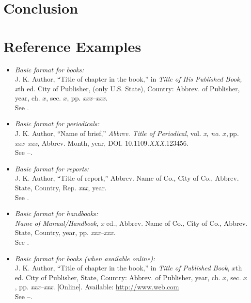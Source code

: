 \documentclass{IEEEtran}
\begin{document}
\section{Conclusion}

\vfill
\pagebreak

\section{Reference Examples}

\begin{itemize}

\item \emph{Basic format for books:}\\
J. K. Author, ``Title of chapter in the book,'' in \emph{Title of His Published Book, x}th ed. City of Publisher, (only U.S. State), Country: Abbrev. of Publisher, year, ch. $x$, sec. $x$, pp. \emph{xxx--xxx.}\\
See \cite{b1,b2}.

\item \emph{Basic format for periodicals:}\\
J. K. Author, ``Name of brief,'' \emph{Abbrev. Title of Periodical}, vol. \emph{x, no}. $x, $pp\emph{. xxx--xxx, }Abbrev. Month, year, DOI. 10.1109.\emph{XXX}.123456.\\
See \cite{b3}--\cite{b5}.

\item \emph{Basic format for reports:}\\
J. K. Author, ``Title of report,'' Abbrev. Name of Co., City of Co., Abbrev. State, Country, Rep. \emph{xxx}, year.\\
See \cite{b6,b7}.

\item \emph{Basic format for handbooks:}\\
\emph{Name of Manual/Handbook, x} ed., Abbrev. Name of Co., City of Co., Abbrev. State, Country, year, pp. \emph{xxx--xxx.}\\
See \cite{b8,b9}.

\item \emph{Basic format for books (when available online):}\\
J. K. Author, ``Title of chapter in the book,'' in \emph{Title of
Published Book}, $x$th ed. City of Publisher, State, Country: Abbrev.
of Publisher, year, ch. $x$, sec. $x$, pp. \emph{xxx--xxx}. [Online].
Available: \underline{http://www.web.com}\\
See \cite{b10}--\cite{b13}.


\end{itemize}
\end{document}
